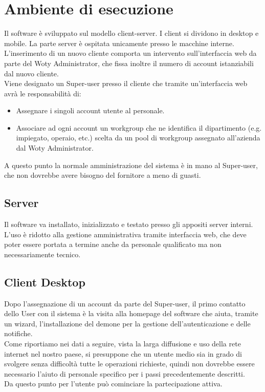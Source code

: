 \section{Ambiente di esecuzione}
Il software è sviluppato sul modello client-server. I client si dividono in desktop e mobile. La parte server è ospitata unicamente presso le macchine interne.\\
L'inserimento di un nuovo cliente comporta un intervento sull'interfaccia web da parte del Woty Administrator, che fissa inoltre il numero di account istanziabili dal nuovo cliente.\\
Viene designato un Super-user presso il cliente che tramite un'interfaccia web avrà le responsabilità di:
\begin{itemize}
\item{ Assegnare i singoli account utente al personale. }
\item{ Associare ad ogni account un workgroup che ne identifica il dipartimento (e.g. impiegato, operaio, etc.) scelta da un pool di workgroup assegnato all'azienda dal Woty Administrator. }
\end{itemize}

A questo punto la normale amministrazione del sistema è in mano al Super-user, che non dovrebbe avere bisogno del fornitore a meno di guasti.

\subsection{Server}
Il software va installato, inizializzato e testato presso gli appositi server interni.\\
L'uso è ridotto alla gestione amministrativa tramite interfaccia web, che deve poter essere portata a termine anche da personale qualificato ma non necessariamente tecnico.

\newpage

\subsection{Client Desktop}
Dopo l'assegnazione di un account da parte del Super-user, il primo contatto dello User con il sistema è la visita alla homepage del software che aiuta, tramite un wizard, l'installazione del demone per la gestione dell'autenticazione e delle notifiche.\\
Come riportiamo nei dati a seguire, vista la larga diffusione e uso della rete internet nel nostro paese, si presuppone che un utente medio sia in grado di svolgere senza difficoltà tutte le operazioni richieste, quindi non dovrebbe essere necessario l'aiuto di personale specifico per i passi precedentemente descritti.\\
Da questo punto per l'utente può cominciare la partecipazione attiva.\\


